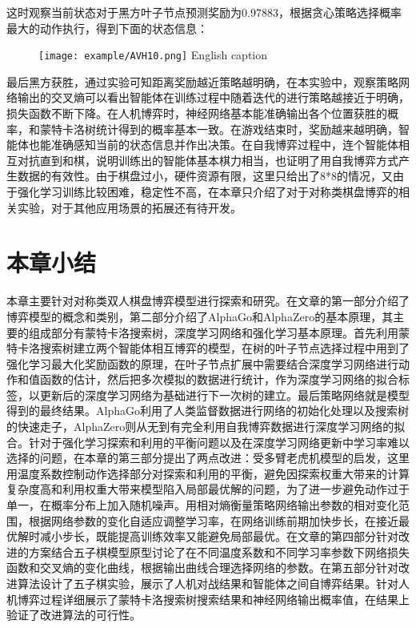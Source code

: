 这时观察当前状态对于黑方叶子节点预测奖励为0.97883，根据贪心策略选择概率最大的动作执行，得到下面的状态信息：

\begin{figure}[!htp]
	\centering
	\texttt{[image: example/AVH10.png]}
	\hspace{0.5cm}
	{English caption}
	\label{fig:human6}
\end{figure}

最后黑方获胜，通过实验可知距离奖励越近策略越明确，在本实验中，观察策略网络输出的交叉熵可以看出智能体在训练过程中随着迭代的进行策略越接近于明确，损失函数不断下降。在人机博弈时，神经网络基本能准确输出各个位置获胜的概率，和蒙特卡洛树统计得到的概率基本一致。在游戏结束时，奖励越来越明确，智能体也能准确感知当前的状态信息并作出决策。在自我博弈过程中，连个智能体相互对抗直到和棋，说明训练出的智能体基本棋力相当，也证明了用自我博弈方式产生数据的有效性。由于棋盘过小，硬件资源有限，这里只给出了8*8的情况，又由于强化学习训练比较困难，稳定性不高，在本章只介绍了对于对称类棋盘博弈的相关实验，对于其他应用场景的拓展还有待开发。
\section{本章小结}
本章主要针对对称类双人棋盘博弈模型进行探索和研究。在文章的第一部分介绍了博弈模型的概念和类别，第二部分介绍了AlphaGo和AlphaZero的基本原理，其主要的组成部分有蒙特卡洛搜索树，深度学习网络和强化学习基本原理。首先利用蒙特卡洛搜索树建立两个智能体相互博弈的模型，在树的叶子节点选择过程中用到了强化学习最大化奖励函数的原理，在叶子节点扩展中需要结合深度学习网络进行动作和值函数的估计，然后把多次模拟的数据进行统计，作为深度学习网络的拟合标签，以更新后的深度学习网络为基础进行下一次树的建立。最后策略网络就是模型得到的最终结果。AlphaGo利用了人类监督数据进行网络的初始化处理以及搜索树的快速走子，AlphaZero则从无到有完全利用自我博弈数据进行深度学习网络的拟合。针对于强化学习探索和利用的平衡问题以及在深度学习网络更新中学习率难以选择的问题，在本章的第三部分提出了两点改进：受多臂老虎机模型的启发，这里用温度系数控制动作选择部分对探索和利用的平衡，避免因探索权重大带来的计算复杂度高和利用权重大带来模型陷入局部最优解的问题，为了进一步避免动作过于单一，在概率分布上加入随机噪声。用相对熵衡量策略网络输出参数的相对变化范围，根据网络参数的变化自适应调整学习率，在网络训练前期加快步长，在接近最优解时减小步长，既能提高训练效率又能避免局部最优。在文章的第四部分针对改进的方案结合五子棋模型原型讨论了在不同温度系数和不同学习率参数下网络损失函数和交叉熵的变化曲线，根据输出曲线合理选择网络的参数。在第五部分针对改进算法设计了五子棋实验，展示了人机对战结果和智能体之间自博弈结果。针对人机博弈过程详细展示了蒙特卡洛搜索树搜索结果和神经网络输出概率值，在结果上验证了改进算法的可行性。